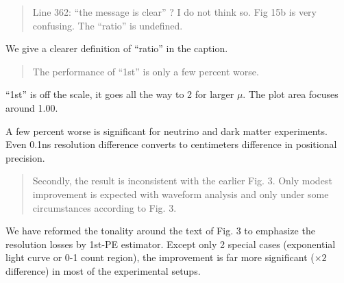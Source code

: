 \documentclass[12pt]{article}
\begin{document}
\begin{quote}
Line 362: ``the message is clear'' ? I do not think so. Fig 15b is very confusing. The ``ratio'' is undefined. 
\end{quote}

We give a clearer definition of ``ratio'' in the caption.

\begin{quote}
The performance of ``1st'' is only a few percent worse. 
\end{quote}

``1st'' is off the scale, it goes all the way to 2 for larger $\mu$.  The plot area focuses around 1.00.

A few percent worse is significant for neutrino and dark matter experiments.  Even 0.1ns resolution difference converts to centimeters difference in positional precision.

\begin{quote}
Secondly, the result is inconsistent with the earlier Fig. 3. Only modest improvement is expected with waveform analysis and only under some circumstances according to Fig. 3.
\end{quote}

We have reformed the tonality around the text of Fig. 3 to emphasize the resolution losses by 1st-PE estimator.  Except only 2 special cases (exponential light curve or 0-1 count region), the improvement is far more significant ($\times 2$ difference) in most of the experimental setups.
\end{document}
